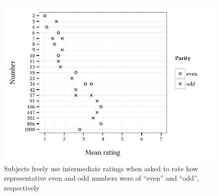 \begin{figure}
\centering
\includegraphics{agg.pdf}
\caption{Subjects freely use intermediate ratings when asked to rate how representative even and odd numbers were of ``even'' and ``odd'', respectively \citep{Armstrong1983}}
\label{agg}
\end{figure}




